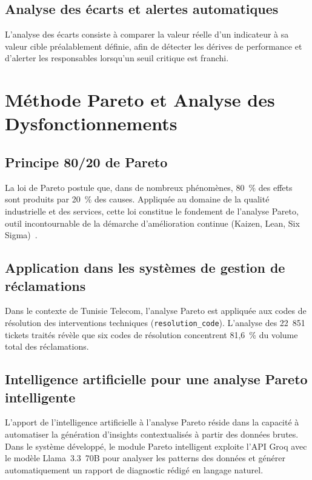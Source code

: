 \documentclass[11pt,a4paper]{report}
\begin{document}
\subsection{Analyse des écarts et alertes automatiques}

L'analyse des écarts consiste à comparer la valeur réelle d'un indicateur à sa valeur cible préalablement définie, afin de détecter les dérives de performance et d'alerter les responsables lorsqu'un seuil critique est franchi.

\section{Méthode Pareto et Analyse des Dysfonctionnements}

\subsection{Principe 80/20 de Pareto}

La loi de Pareto postule que, dans de nombreux phénomènes, 80~\% des effets sont produits par 20~\% des causes. Appliquée au domaine de la qualité industrielle et des services, cette loi constitue le fondement de l'analyse Pareto, outil incontournable de la démarche d'amélioration continue (Kaizen, Lean, Six Sigma)~\cite{imai1986}.

\subsection{Application dans les systèmes de gestion de réclamations}

Dans le contexte de Tunisie Telecom, l'analyse Pareto est appliquée aux codes de résolution des interventions techniques (\texttt{resolution\_code}). L'analyse des 22~851 tickets traités révèle que six codes de résolution concentrent 81,6~\% du volume total des réclamations.

\subsection{Intelligence artificielle pour une analyse Pareto intelligente}

L'apport de l'intelligence artificielle à l'analyse Pareto réside dans la capacité à automatiser la génération d'insights contextualisés à partir des données brutes. Dans le système développé, le module Pareto intelligent exploite l'API Groq avec le modèle Llama~3.3~70B pour analyser les patterns des données et générer automatiquement un rapport de diagnostic rédigé en langage naturel.
\end{document}
